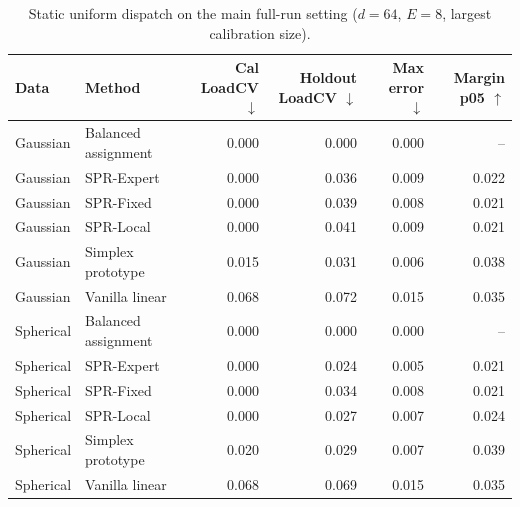 \begin{table}[t]
\centering
\caption{Static uniform dispatch on the main full-run setting ($d=64$, $E=8$, largest calibration size).}
\label{tab:e1_static_dispatch}
\begin{tabular}{llrrrr}
\toprule
Data & Method & Cal LoadCV $\downarrow$ & Holdout LoadCV $\downarrow$ & Max error $\downarrow$ & Margin p05 $\uparrow$ \\
\midrule
Gaussian & Balanced assignment & 0.000 & 0.000 & 0.000 & -- \\
Gaussian & SPR-Expert & 0.000 & 0.036 & 0.009 & 0.022 \\
Gaussian & SPR-Fixed & 0.000 & 0.039 & 0.008 & 0.021 \\
Gaussian & SPR-Local & 0.000 & 0.041 & 0.009 & 0.021 \\
Gaussian & Simplex prototype & 0.015 & 0.031 & 0.006 & 0.038 \\
Gaussian & Vanilla linear & 0.068 & 0.072 & 0.015 & 0.035 \\
Spherical & Balanced assignment & 0.000 & 0.000 & 0.000 & -- \\
Spherical & SPR-Expert & 0.000 & 0.024 & 0.005 & 0.021 \\
Spherical & SPR-Fixed & 0.000 & 0.034 & 0.008 & 0.021 \\
Spherical & SPR-Local & 0.000 & 0.027 & 0.007 & 0.024 \\
Spherical & Simplex prototype & 0.020 & 0.029 & 0.007 & 0.039 \\
Spherical & Vanilla linear & 0.068 & 0.069 & 0.015 & 0.035 \\
\bottomrule
\end{tabular}
\end{table}
